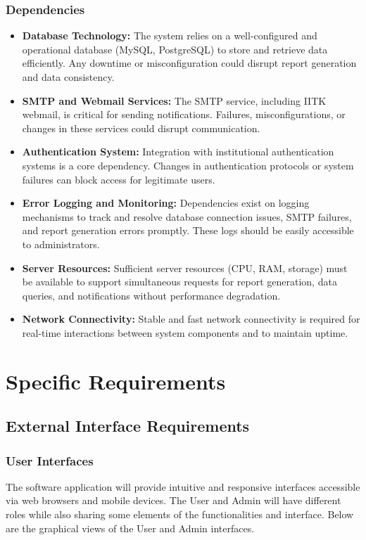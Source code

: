 \documentclass[a4paper,12pt]{article}
\begin{document}
\subsubsection{Dependencies}
    \begin{itemize}
        \item \textbf{Database Technology:} The system relies on a well-configured and operational database (MySQL, PostgreSQL) to store and retrieve data efficiently. Any downtime or misconfiguration could disrupt report generation and data consistency.
        \item \textbf{SMTP and Webmail Services:} The SMTP service, including IITK webmail, is critical for sending notifications. Failures, misconfigurations, or changes in these services could disrupt communication.
        \item \textbf{Authentication System:} Integration with institutional authentication systems is a core dependency. Changes in authentication protocols or system failures can block access for legitimate users.
        \item \textbf{Error Logging and Monitoring:} Dependencies exist on logging mechanisms to track and resolve database connection issues, SMTP failures, and report generation errors promptly. These logs should be easily accessible to administrators.
        \item \textbf{Server Resources:} Sufficient server resources (CPU, RAM, storage) must be available to support simultaneous requests for report generation, data queries, and notifications without performance degradation.
        \item \textbf{Network Connectivity:} Stable and fast network connectivity is required for real-time interactions between system components and to maintain uptime.
    \end{itemize}
\newpage
\section{Specific Requirements} \label{sec:specific_reqs}
\subsection{External Interface Requirements}\label{subsec:ext_interface_reqs}
\subsubsection{User Interfaces}
The software application will provide intuitive and responsive interfaces accessible via web browsers and mobile devices. The User and Admin will have different roles while also sharing some elements of the functionalities and interface. Below are the graphical views of the User and Admin interfaces.
\end{document}
